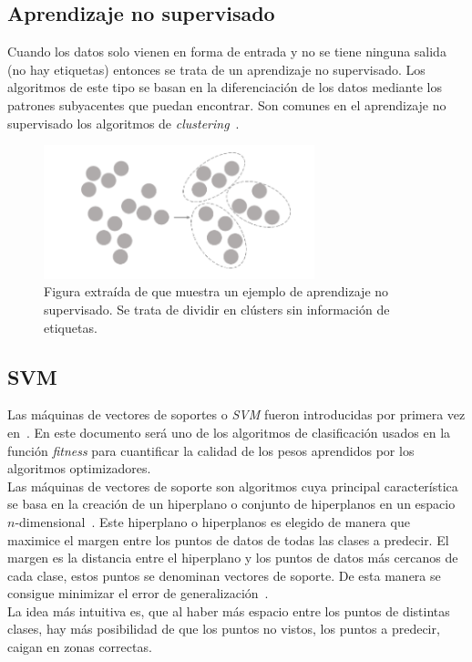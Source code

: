 \subsection{Aprendizaje no supervisado}
Cuando los datos solo vienen en forma de entrada y no se tiene ninguna salida (no hay etiquetas) entonces se trata de un aprendizaje no supervisado. Los algoritmos de este tipo se basan en la diferenciación de los datos mediante los patrones subyacentes que puedan encontrar. Son comunes en el aprendizaje no supervisado los algoritmos de \textit{clustering}~\cite{sah2020machine}.

\begin{figure}[H]
    \begin{center}
        \includegraphics[width=0.7\textwidth]{imagenes/ml_unsupervised-learning.png}
    \end{center}
    \caption[Aprendizaje no supervisado]{Figura extraída de \cite{sah2020machine} que muestra un ejemplo de aprendizaje no supervisado. Se trata de dividir en clústers sin información de etiquetas.}
\end{figure}

\subsection{SVM}
Las máquinas de vectores de soportes o \textit{SVM} fueron introducidas por primera vez en~\cite{cortes_support-vector_1995}. En este documento será uno de los algoritmos de clasificación usados en la función \textit{fitness} para cuantificar la calidad de los pesos aprendidos por los algoritmos optimizadores.\\[6pt]
Las máquinas de vectores de soporte son algoritmos cuya principal característica se basa en la creación de un hiperplano o conjunto de hiperplanos en un espacio $n$-dimensional~\cite{scikit-learn-svm,}. Este hiperplano o hiperplanos es elegido de manera que maximice el margen entre los puntos de datos de todas las clases a predecir. El margen es la distancia entre el hiperplano y los puntos de datos más cercanos de cada clase, estos puntos se denominan vectores de soporte. De esta manera se consigue minimizar el error de generalización~\cite{hastie2009elements}.\\[6pt]
La idea más intuitiva es, que al haber más espacio entre los puntos de distintas clases, hay más posibilidad de que los puntos no vistos, los puntos a predecir, caigan en zonas correctas.

